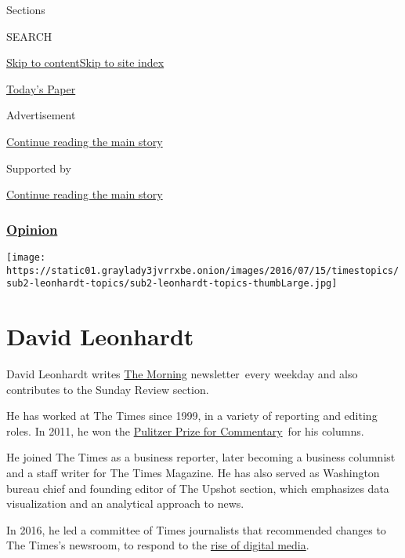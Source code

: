 Sections

SEARCH

\protect\hyperlink{site-content}{Skip to
content}\protect\hyperlink{site-index}{Skip to site index}

\href{https://myaccount.nytimes3xbfgragh.onion/auth/login?response_type=cookie\&client_id=vi}{}

\href{https://www.nytimes3xbfgragh.onion/section/todayspaper}{Today's
Paper}

Advertisement

\protect\hyperlink{after-top}{Continue reading the main story}

Supported by

\protect\hyperlink{after-sponsor}{Continue reading the main story}

\hypertarget{opinion}{%
\subsubsection{\texorpdfstring{\href{/section/opinion}{Opinion}}{Opinion}}\label{opinion}}

\texttt{[image: https://static01.graylady3jvrrxbe.onion/images/2016/07/15/timestopics/sub2-leonhardt-topics/sub2-leonhardt-topics-thumbLarge.jpg]}

\hypertarget{david-leonhardt}{%
\section{David Leonhardt}\label{david-leonhardt}}

David Leonhardt writes
\href{https://www.nytimes3xbfgragh.onion/series/us-morning-briefing}{The
Morning} newsletter~every weekday and also contributes to the Sunday
Review section.

He has worked at The Times since 1999, in a variety of reporting and
editing roles. In 2011, he won the
\href{https://www.pulitzer.org/winners/david-leonhardt}{Pulitzer Prize
for Commentary}~for his columns.

He joined The Times as a business reporter, later becoming a business
columnist and a staff writer for The Times Magazine. He has also served
as Washington bureau chief and founding editor of The Upshot section,
which emphasizes data visualization and an analytical approach to news.

In 2016, he led a committee of Times journalists that recommended
changes to The Times's newsroom, to respond to the
\href{https://www.nytimes3xbfgragh.onion/projects/2020-report/index.html}{rise
of digital media}.~

